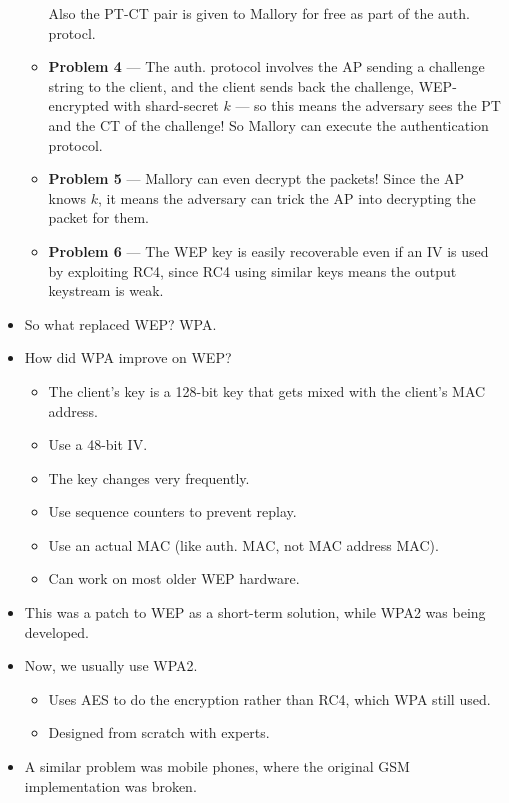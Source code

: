 \documentclass{article}
\begin{document}
\begin{itemize}
\begin{itemize}
                Also the PT-CT pair is given to Mallory for free as part of the auth. protocl.
            \item \textbf{Problem 4} --- The auth. protocol involves the AP sending a challenge string to the client, and the client sends back the challenge, WEP-encrypted with shard-secret $k$ --- so this means the adversary sees the PT and the CT of the challenge!  So Mallory can execute the authentication protocol.
            \item \textbf{Problem 5} --- Mallory can even decrypt the packets!  Since the AP knows $k$, it means the adversary can trick the AP into decrypting the packet for them.
            \item \textbf{Problem 6} --- The WEP key is easily recoverable even if an IV is used by exploiting RC4, since RC4 using similar keys means the output keystream is weak.
        \end{itemize}
    \item So what replaced WEP?  WPA.
    \item How did WPA improve on WEP?
        \begin{itemize}
            \item The client's key is a 128-bit key that gets mixed with the client's MAC address.
            \item Use a 48-bit IV.
            \item The key changes very frequently.
            \item Use sequence counters to prevent replay.
            \item Use an actual MAC (like auth. MAC, not MAC address MAC).
            \item Can work on most older WEP hardware.
        \end{itemize}
    \item This was a patch to WEP as a short-term solution, while WPA2 was being developed.
    \item Now, we usually use WPA2.
        \begin{itemize}
            \item Uses AES to do the encryption rather than RC4, which WPA still used.
            \item Designed from scratch with experts.
        \end{itemize}
    \item A similar problem was mobile phones, where the original GSM implementation was broken.
\end{itemize}
\end{document}
